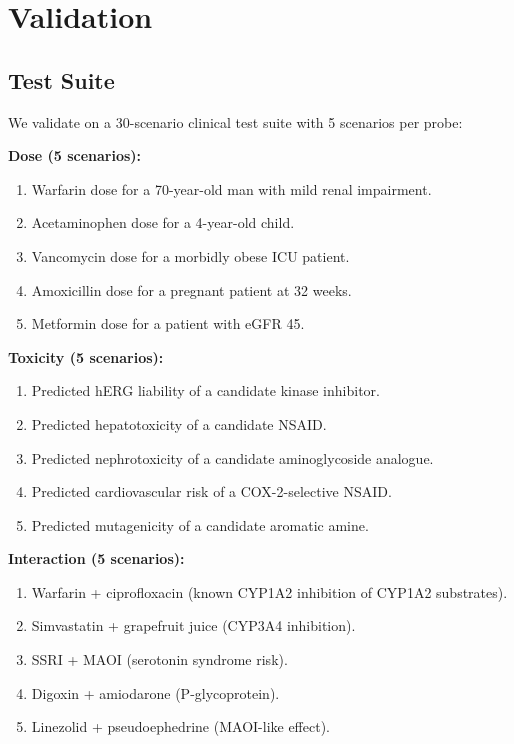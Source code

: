 \documentclass[11pt,twocolumn,a4paper]{article}
\theoremstyle{definition}
\theoremstyle{remark}
\begin{document}
\section{Validation}
\label{sec:validation}

\subsection{Test Suite}

We validate on a 30-scenario clinical test suite with 5 scenarios per probe:

\textbf{Dose (5 scenarios):}
\begin{enumerate}[nosep,label=D\arabic*.]
\item Warfarin dose for a 70-year-old man with mild renal impairment.
\item Acetaminophen dose for a 4-year-old child.
\item Vancomycin dose for a morbidly obese ICU patient.
\item Amoxicillin dose for a pregnant patient at 32 weeks.
\item Metformin dose for a patient with eGFR 45.
\end{enumerate}

\textbf{Toxicity (5 scenarios):}
\begin{enumerate}[nosep,label=T\arabic*.]
\item Predicted hERG liability of a candidate kinase inhibitor.
\item Predicted hepatotoxicity of a candidate NSAID.
\item Predicted nephrotoxicity of a candidate aminoglycoside analogue.
\item Predicted cardiovascular risk of a COX-2-selective NSAID.
\item Predicted mutagenicity of a candidate aromatic amine.
\end{enumerate}

\textbf{Interaction (5 scenarios):}
\begin{enumerate}[nosep,label=I\arabic*.]
\item Warfarin + ciprofloxacin (known CYP1A2 inhibition of CYP1A2 substrates).
\item Simvastatin + grapefruit juice (CYP3A4 inhibition).
\item SSRI + MAOI (serotonin syndrome risk).
\item Digoxin + amiodarone (P-glycoprotein).
\item Linezolid + pseudoephedrine (MAOI-like effect).
\end{enumerate}
\end{document}
